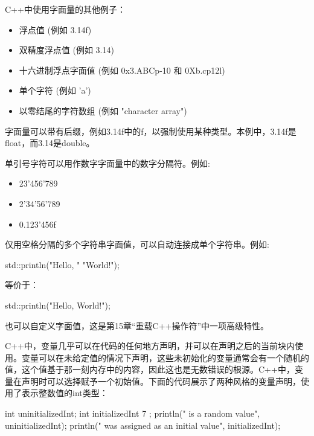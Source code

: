 C++中使用字面量的其他例子：

\begin{itemize}
\item
浮点值 (例如 3.14f)

\item
双精度浮点值 (例如 3.14)

\item
十六进制浮点字面值 (例如 0x3.ABCp-10 和 0Xb.cp12l)

\item
单个字符 (例如 'a')

\item
以零结尾的字符数组 (例如 "character array")
\end{itemize}

字面量可以带有后缀，例如3.14f中的f，以强制使用某种类型。本例中，3.14f是float，而3.14是double。

单引号字符可以用作数字字面量中的数字分隔符。例如:

\begin{itemize}
\item
23'456'789

\item
2'34'56'789

\item
0.123'456f
\end{itemize}

仅用空格分隔的多个字符串字面值，可以自动连接成单个字符串。例如:

\begin{cpp}
std::println("Hello, "
             "World!");
\end{cpp}

等价于：

\begin{cpp}
std::println("Hello, World!");
\end{cpp}

也可以自定义字面值，这是第15章“重载C++操作符”中一项高级特性。


C++中，变量几乎可以在代码的任何地方声明，并可以在声明之后的当前块内使用。变量可以在未给定值的情况下声明，这些未初始化的变量通常会有一个随机的值，这个值基于那一刻内存中的内容，因此这也是无数错误的根源。C++中，变量在声明时可以选择赋予一个初始值。下面的代码展示了两种风格的变量声明，使用了表示整数值的int类型：

\begin{cpp}
int uninitializedInt;
int initializedInt { 7 };
println("{} is a random value", uninitializedInt);
println("{} was assigned as an initial value", initializedInt);
\end{cpp}

